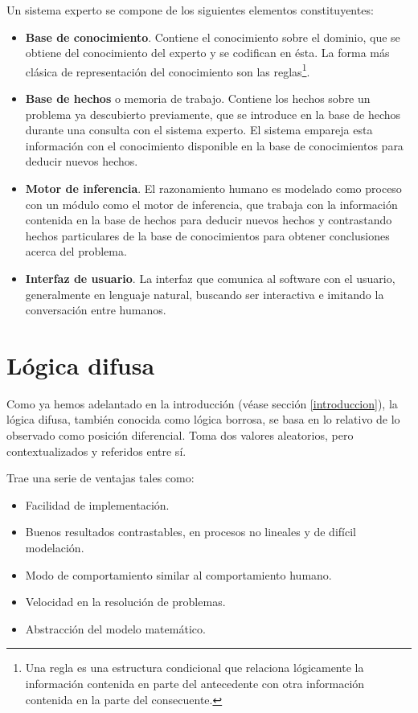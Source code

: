\documentclass[a4paper, 11pt, titlepage]{article}
\begin{document}
        Un sistema experto se compone de los siguientes elementos constituyentes:

        \begin{itemize}
            \item \textbf{Base de conocimiento}. Contiene el conocimiento sobre el 
            dominio, que se obtiene del conocimiento del experto y se codifican en ésta.
            La forma más clásica de representación del conocimiento son las reglas\footnote{
                Una regla es una estructura condicional que relaciona lógicamente la 
                información contenida en parte del antecedente con otra información 
                contenida en la parte del consecuente.
            }.
            \item \textbf{Base de hechos} o memoria de trabajo. Contiene los hechos sobre 
            un problema ya descubierto previamente, que se introduce en la base de hechos 
            durante una consulta con el sistema experto. El sistema empareja esta información  
            con el conocimiento disponible en la base de conocimientos para deducir nuevos 
            hechos.
            \item \textbf{Motor de inferencia}. El razonamiento humano es modelado como proceso 
            con un módulo como el motor de inferencia, que trabaja con la información contenida 
            en la base de hechos para deducir nuevos hechos y contrastando hechos particulares 
            de la base de conocimientos para obtener conclusiones acerca del problema.
            \item \textbf{Interfaz de usuario}. La interfaz que comunica al software con el usuario, 
            generalmente en lenguaje natural, buscando ser interactiva e imitando la conversación
            entre humanos.
        \end{itemize}
        
\section{Lógica difusa}

    Como ya hemos adelantado en la introducción (véase sección \ref{introduccion}), la lógica difusa, 
    también conocida como lógica borrosa, se basa en lo relativo de lo observado como posición 
    diferencial. Toma dos valores aleatorios, pero contextualizados y referidos entre sí.

    Trae una serie de ventajas tales como:

    \begin{itemize}
        \item Facilidad de implementación.
        \item Buenos resultados contrastables, en procesos no lineales y de difícil modelación.
        \item Modo de comportamiento similar al comportamiento humano.
        \item Velocidad en la resolución de problemas.
        \item Abstracción del modelo matemático.
    \end{itemize}
\end{document}

